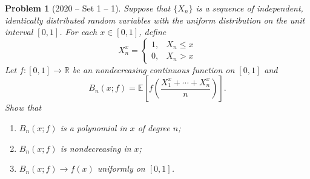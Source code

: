 \documentclass[12pt]{amsart}
\newtheorem{problem}{Problem}
\begin{document}
\begin{problem}[2020 -- Set 1 -- 1]
Suppose that $\{X_n\}$ is a sequence of independent, identically distributed random variables with the uniform distribution on the unit interval $[0,1]$. For each $x \in[0,1]$, define
$$
X_n^x= \begin{cases}1, & X_n \leq x \\ 0, & X_n>x\end{cases}
$$
Let $f:[0,1] \rightarrow \mathbb{R}$ be an nondecreasing continuous function on $[0,1]$ and
$$
B_n(x ; f)=\mathbb{E}[f(\frac{X_1^x+\cdots+X_n^x}{n})].
$$
Show that
\begin{enumerate}[label=(\alph*)]
\item $B_n(x ; f)$ is a polynomial in $x$ of degree $n$; 
\item $B_n(x ; f)$ is nondecreasing in $x$;
\item $B_n(x ; f) \rightarrow f(x)$ uniformly on $[0,1]$.
\end{enumerate}
\end{problem}
\end{document}
